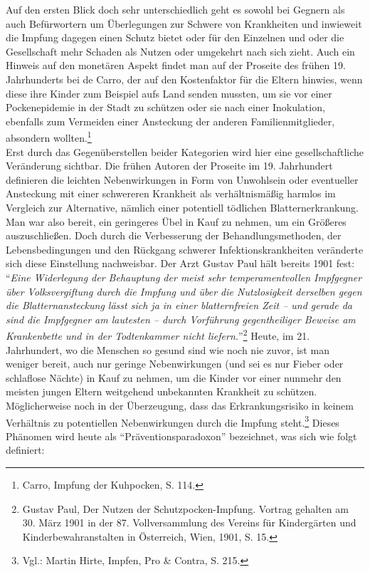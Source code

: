 \documentclass[
    a4paper,
    12pt,
    hyphens,
    chapterprefix=true,
    headheight=33pt,
    footheight=29pt,
    headings=optiontohead,
]{scrartcl}
\begin{document}
{Auf den ersten Blick doch sehr unterschiedlich geht es sowohl bei Gegnern als auch Befürwortern um Überlegungen zur Schwere von Krankheiten und inwieweit die Impfung dagegen einen Schutz bietet oder für den Einzelnen und oder die Gesellschaft mehr Schaden als Nutzen oder umgekehrt nach sich zieht. Auch ein Hinweis auf den monetären Aspekt findet man auf der Proseite des frühen 19. Jahrhunderts bei de Carro, der auf den Kostenfaktor für die Eltern hinwies, wenn diese ihre Kinder zum Beispiel aufs Land senden mussten, um sie vor einer Pockenepidemie in der Stadt zu schützen oder sie nach einer Inokulation, ebenfalls zum Vermeiden einer Ansteckung der anderen Familienmitglieder, absondern wollten.\footnote{Carro, Impfung der Kuhpocken, S. 114.}\\
Erst durch das Gegenüberstellen beider Kategorien wird hier eine gesellschaftliche Veränderung sichtbar. Die frühen Autoren der Proseite im 19. Jahrhundert definieren die leichten Nebenwirkungen in Form von Unwohlsein oder eventueller Ansteckung mit einer schwereren Krankheit als verhältnismäßig harmlos im Vergleich zur Alternative, nämlich einer potentiell tödlichen Blatternerkrankung. Man war also bereit, ein geringeres Übel in Kauf zu nehmen, um ein Größeres auszuschließen. Doch durch die Verbesserung der Behandlungsmethoden, der Lebensbedingungen und den Rückgang schwerer Infektionskrankheiten veränderte sich diese Einstellung nachweisbar. Der Arzt Gustav Paul hält bereits 1901 fest: "`\textit{Eine Widerlegung der Behauptung der meist sehr temperamentvollen Impfgegner über Volksvergiftung durch die Impfung und über die Nutzlosigkeit derselben gegen die Blatternansteckung lässt sich ja in einer blatternfreien Zeit -- und gerade da sind die Impfgegner am lautesten -- durch Vorführung gegentheiliger Beweise am Krankenbette und in der Todtenkammer nicht liefern.}"'\footnote{Gustav Paul, Der Nutzen der Schutzpocken-Impfung. Vortrag gehalten am 30. März 1901 in der 87. Vollversammlung des Vereins für Kindergärten und Kinderbewahranstalten in Österreich, Wien, 1901, S. 15.} Heute, im 21. Jahrhundert, wo die Menschen so gesund sind wie noch nie zuvor, ist man weniger bereit, auch nur geringe Nebenwirkungen (und sei es nur Fieber oder schlaflose Nächte) in Kauf zu nehmen, um die Kinder vor einer nunmehr den meisten jungen Eltern weitgehend unbekannten Krankheit zu schützen. Möglicherweise noch in der Überzeugung, dass das Erkrankungsrisiko in keinem Verhältnis zu potentiellen Nebenwirkungen durch die Impfung steht.\footnote{Vgl.: Martin Hirte, Impfen, Pro \& Contra, S. 215.} Dieses Phänomen wird heute als "`Präventionsparadoxon"' bezeichnet, was sich wie folgt definiert:

}
\end{document}
